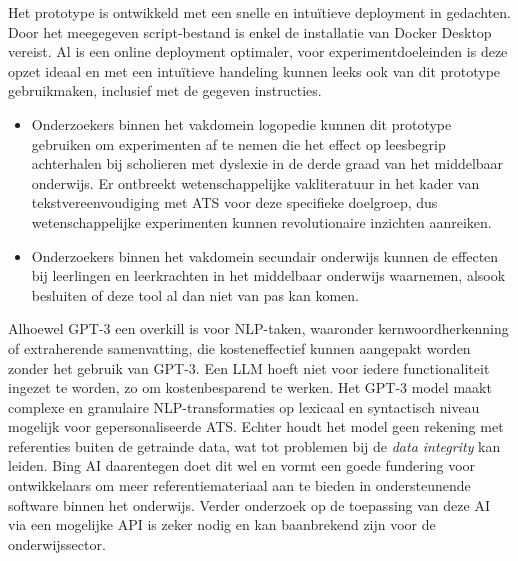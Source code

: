 Het prototype is ontwikkeld met een snelle en intuïtieve deployment in gedachten. Door het meegegeven script-bestand is enkel de installatie van Docker Desktop vereist. Al is een online deployment optimaler, voor experimentdoeleinden is deze opzet ideaal en met een intuïtieve handeling kunnen leeks ook van dit prototype gebruikmaken, inclusief met de gegeven instructies. 

\begin{itemize}
	\item Onderzoekers binnen het vakdomein logopedie kunnen dit prototype gebruiken om experimenten af te nemen die het effect op leesbegrip achterhalen bij scholieren met dyslexie in de derde graad van het middelbaar onderwijs. Er ontbreekt wetenschappelijke vakliteratuur in het kader van tekstvereenvoudiging met ATS voor deze specifieke doelgroep, dus wetenschappelijke experimenten kunnen revolutionaire inzichten aanreiken.
	\item Onderzoekers binnen het vakdomein secundair onderwijs kunnen de effecten bij leerlingen en leerkrachten in het middelbaar onderwijs waarnemen, alsook besluiten of deze tool al dan niet van pas kan komen. 
\end{itemize}




\medspace


Alhoewel GPT-3 een overkill is voor NLP-taken, waaronder kernwoordherkenning of extraherende samenvatting, die kosteneffectief kunnen aangepakt worden zonder het gebruik van GPT-3. Een LLM hoeft niet voor iedere functionaliteit ingezet te worden, zo om kostenbesparend te werken. Het GPT-3 model maakt complexe en granulaire NLP-transformaties op lexicaal en syntactisch niveau mogelijk voor gepersonaliseerde ATS. Echter houdt het model geen rekening met referenties buiten de getrainde data, wat tot problemen bij de \textit{data integrity} kan leiden. Bing AI daarentegen doet dit wel en vormt een goede fundering voor ontwikkelaars om meer referentiemateriaal aan te bieden in ondersteunende software binnen het onderwijs. Verder onderzoek op de toepassing van deze AI via een mogelijke API is zeker nodig en kan baanbrekend zijn voor de onderwijssector. 

